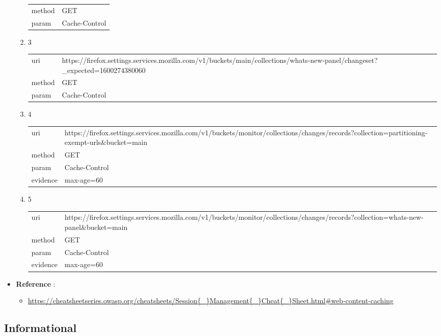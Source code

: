 \documentclass[10pt]{article}
\begin{document}
\begin{itemize}
\begin{enumerate}
\begin{tabular}{| l | p{14cm}}
method & GET \\
param & Cache-Control \\
\end{tabular}
\item[] 3
\begin{tabular}{| l | p{14cm}}
uri & https://firefox.settings.services.mozilla.com/v1/buckets/main/collections/whats-new-panel/changeset?{\_}expected=1600274380060 \\
method & GET \\
param & Cache-Control \\
\end{tabular}
\item[] 4
\begin{tabular}{| l | p{14cm}}
uri & https://firefox.settings.services.mozilla.com/v1/buckets/monitor/collections/changes/records?collection=partitioning-exempt-urls\&bucket=main \\
method & GET \\
param & Cache-Control \\
evidence & max-age=60 \\
\end{tabular}
\item[] 5
\begin{tabular}{| l | p{14cm}}
uri & https://firefox.settings.services.mozilla.com/v1/buckets/monitor/collections/changes/records?collection=whats-new-panel\&bucket=main \\
method & GET \\
param & Cache-Control \\
evidence & max-age=60 \\
\end{tabular}
\end{enumerate}
\item[] \textbf{Reference} : 
\begin{itemize}
\item \url{https://cheatsheetseries.owasp.org/cheatsheets/Session{\_}Management{\_}Cheat{\_}Sheet.html\#web-content-caching}
\end{itemize}
\end{itemize}
\subsection{Informational}
\end{document}
